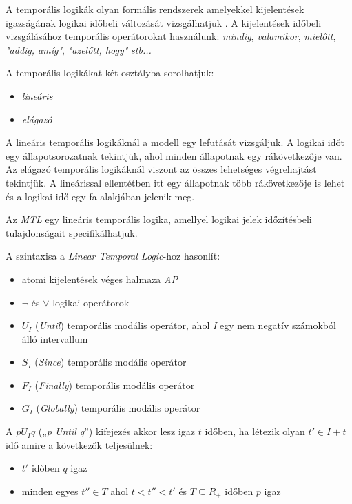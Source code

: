 A temporális logikák olyan formális rendszerek amelyekkel kijelentések igazságának logikai időbeli változását vizsgálhatjuk \cite{MTL1}.
A kijelentések időbeli vizsgálásához temporális operátorokat használunk: \textit{mindig}, \textit{valamikor}, \textit{mielőtt}, \textit{"addig, amíg"}, \textit{"azelőtt, hogy"} \textit{stb...}

A temporális logikákat két osztályba sorolhatjuk:
\begin{itemize}
    \item \textit{lineáris}
    \item \textit{elágazó}
\end{itemize}
A lineáris temporális logikáknál a modell egy lefutását vizsgáljuk.
A logikai időt egy állapotsorozatnak tekintjük, ahol minden állapotnak egy rákövetkezője van.
Az elágazó temporális logikáknál viszont az összes lehetséges végrehajtást tekintjük.
A lineárissal ellentétben itt egy állapotnak több rákövetkezője is lehet és a logikai idő egy fa alakjában jelenik meg.

Az \textit{MTL} \cite{MTL1} egy lineáris temporális logika, amellyel logikai jelek időzítésbeli tulajdonságait specifikálhatjuk.

A szintaxisa a \textit{Linear Temporal Logic}-hoz hasonlít:
\begin{itemize}
    \item atomi kijelentések véges halmaza \textit{AP}
    \item $\neg$ és $\lor$ logikai operátorok
    \item $U_I$ (\textit{Until}) temporális modális operátor, ahol \textit{I} egy nem negatív számokból álló intervallum
    \item $S_I$ (\textit{Since}) temporális modális operátor
    \item $F_I$ (\textit{Finally}) temporális modális operátor
    \item $G_I$ (\textit{Globally}) temporális modális operátor
\end{itemize}

A $p U_I q$ („\textit{p Until q}”) kifejezés akkor lesz igaz $t$ időben, ha létezik olyan $t' \in I + t$ idő amire a következők teljesülnek:
\begin{itemize}
    \item $t'$ időben $q$ igaz
    \item minden egyes $t'' \in T$ ahol $t < t'' < t'$ és $T \subseteq {R} _{+}$ időben $p$ igaz
\end{itemize}

